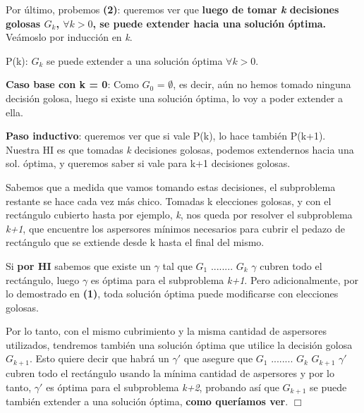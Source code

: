 Por último, probemos \textbf{(2)}: queremos ver que \textbf{luego de tomar \textit{k} decisiones golosas $G_{k}$, $\forall k > 0$, se puede extender hacia una solución óptima.} Veámoslo por inducción en \textit{k}. \newline 

P(k): $G_{k}$ se puede extender a una solución óptima $\forall k > 0$. \newline

\textbf{Caso base con k = 0}: Como $G_{0}$ = $\emptyset$, es decir, aún no hemos tomado ninguna decisión golosa, luego si existe una solución óptima, lo voy a poder extender a ella.  \newline

\textbf{Paso inductivo}: queremos ver que si vale P(k), lo hace también P(k+1). 
Nuestra HI es que tomadas \textit{k} decisiones golosas, podemos extendernos hacia una sol. óptima, y queremos saber si vale para k+1 decisiones golosas. \newline

Sabemos que a medida que vamos tomando estas decisiones, el subproblema restante se hace cada vez más chico. Tomadas k elecciones golosas, y con el rectángulo cubierto hasta por ejemplo, \textit{k}, nos queda por resolver el subproblema \textit{k+1}, que encuentre los aspersores mínimos necesarios para cubrir el pedazo de rectángulo que se extiende desde k hasta el final del mismo. \newline

Si \textbf{por HI} sabemos que existe un $\gamma$ tal que $G_{1}$ \cup ........ \cup $ G_{k}$ \cup $ \gamma$ cubren todo el rectángulo, luego $\gamma$ es óptima para el subproblema \textit{k+1}. Pero adicionalmente, por lo demostrado en \textbf{(1)}, toda solución óptima puede modificarse con elecciones golosas. \newline

Por lo tanto, con el mismo cubrimiento y la misma cantidad de aspersores utilizados, tendremos también una solución óptima que utilice la decisión golosa  $G_{k+1}$. Esto quiere decir que habrá un $ \gamma'$ que asegure que $G_{1}$ \cup ........ \cup $ G_{k}$ \cup $ G_{k+1}$ \cup $ \gamma'$ cubren todo el rectángulo usando la mínima cantidad de aspersores y por lo tanto, $ \gamma'$ es óptima para el subproblema \textit{k+2}, probando así que $G_{k+1}$ se puede también extender a una solución óptima, \textbf{como queríamos ver}. 
{\qedwhite}{\hfill \ensuremath{\Box}} \newline\newline

